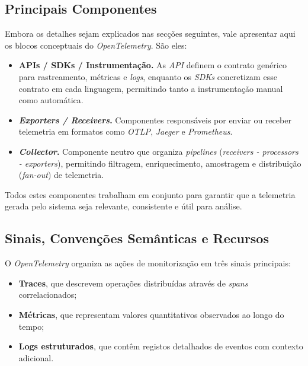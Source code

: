 \subsection{Principais Componentes}

Embora os detalhes sejam explicados nas secções seguintes, vale apresentar aqui os blocos conceptuais do \textit{OpenTelemetry}. São eles:

\begin{itemize}
    \item \textbf{APIs / SDKs / Instrumentação.} As \textit{API} definem o contrato genérico para rastreamento, métricas e \textit{logs}, enquanto os \textit{SDKs} concretizam esse contrato em cada linguagem, permitindo tanto a instrumentação manual como automática.
    
    \item \textbf{\textit{Exporters / Receivers}.} Componentes responsáveis por enviar ou receber telemetria em formatos como \textit{OTLP}, \textit{Jaeger} e \textit{Prometheus}.
    
    \item \textbf{\textit{Collector}.} Componente neutro que organiza \textit{pipelines} (\textit{receivers - processors - exporters}), permitindo filtragem, enriquecimento, amostragem e distribuição (\textit{fan-out}) de telemetria.
\end{itemize}

Todos estes componentes trabalham em conjunto para garantir que a telemetria gerada pelo sistema seja relevante, consistente e útil para análise.

\subsection{Sinais, Convenções Semânticas e Recursos}

O \textit{OpenTelemetry} organiza as ações de monitorização em três sinais principais:

\begin{itemize}
    \item \textbf{Traces}, que descrevem operações distribuídas através de \textit{spans} correlacionados;
    \item \textbf{Métricas}, que representam valores quantitativos observados ao longo do tempo;
    \item \textbf{Logs estruturados}, que contêm registos detalhados de eventos com contexto adicional.
\end{itemize}

